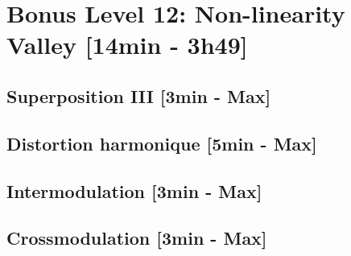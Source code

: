
\section{Bonus Level 12: Non-linearity Valley [14min - 3h49]}
\subsection{Superposition III [3min - Max]}

\subsection{Distortion harmonique [5min - Max]}

\subsection{Intermodulation [3min - Max]}

\subsection{Crossmodulation [3min - Max]}
